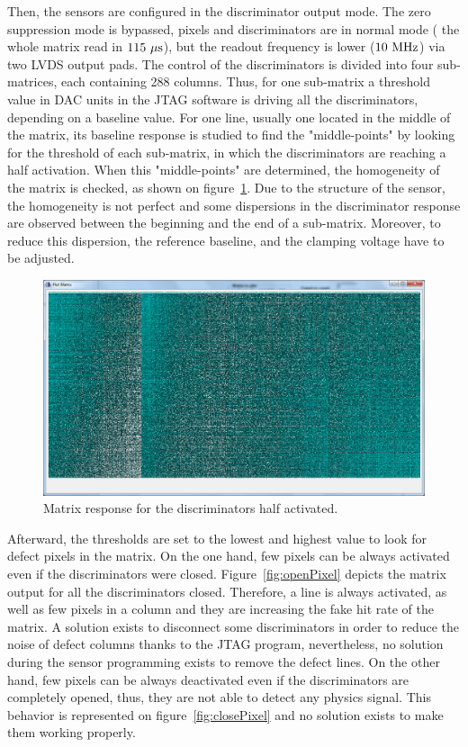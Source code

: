   Then, the sensors are configured in the discriminator output mode.
  The zero suppression mode is bypassed, pixels and discriminators are in normal mode ( the whole matrix read in $115~\mu\rm{s}$), but the readout frequency is lower ($10~\rm{MHz}$) via two LVDS output pads.
  The control of the discriminators is divided into four sub-matrices, each containing 288 columns.
  Thus, for one sub-matrix a threshold value in DAC units in the \gls{JTAG} software is driving all the discriminators, depending on a baseline value.
  For one line, usually one located in the middle of the matrix, its baseline response is studied to find the "middle-points" by looking for the threshold of each sub-matrix, in which the discriminators are reaching a half activation.
  When this "middle-points" are determined, the homogeneity of the matrix is checked, as shown on figure~\ref{fig:homogeneityMi26}.
  Due to the structure of the sensor, the homogeneity is not perfect and some dispersions in the discriminator response are observed between the beginning and the end of a sub-matrix.
  Moreover, to reduce this dispersion, the reference baseline, and the clamping voltage have to be adjusted.
  
  \begin{figure}[!h]
    \centering
    \includegraphics[width = \textwidth]{Pictures/labTests/discri_middle.png}
    \caption{Matrix response for the discriminators half activated.}
    \label{fig:homogeneityMi26}
  \end{figure}
  
  Afterward, the thresholds are set to the lowest and highest value to look for defect pixels in the matrix.
  On the one hand, few pixels can be always activated even if the discriminators were closed.
  Figure~\ref{fig:openPixel} depicts the matrix output for all the discriminators closed.
  Therefore, a line is always activated, as well as few pixels in a column and they are increasing the fake hit rate of the matrix.
  A solution exists to disconnect some discriminators in order to reduce the noise of defect columns thanks to the \gls{JTAG} program, nevertheless, no solution during the sensor programming exists to remove the defect lines.
  On the other hand, few pixels can be always deactivated even if the discriminators are completely opened, thus, they are not able to detect any physics signal.
  This behavior is represented on figure~\ref{fig:closePixel} and no solution exists to make them working properly.
   
